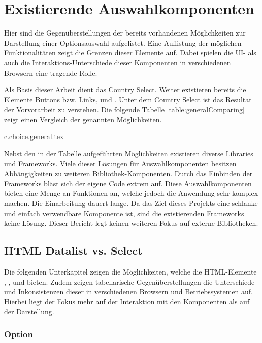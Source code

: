 \chapter{Existierende Auswahlkomponenten}
\label{chap:existingComponents}

Hier sind die Gegenüberstellungen der bereits vorhandenen Möglichkeiten zur Darstellung einer Optionsauswahl aufgelistet. 
Eine Auflistung der möglichen Funktionalitäten zeigt die Grenzen dieser Elemente auf. 
Dabei spielen die UI- als auch die Interaktions-Unterschiede dieser Komponenten in verschiedenen Browsern eine tragende Rolle. 

Als Basis dieser Arbeit dient das Country Select. 
Weiter existieren bereits die Elemente Buttons bzw. Links,  und . 
Unter dem Country Select ist das Resultat der Vorvorarbeit zu verstehen. 
Die folgende Tabelle \ref{table:generalComparing} zeigt einen Vergleich der genannten Möglichkeiten. 

{c.choice.general.tex}

Nebst den in der Tabelle aufgeführten Möglichkeiten existieren diverse Libraries und Frameworks. 
Viele dieser Lösungen für Auswahlkomponenten besitzen Abhängigkeiten zu weiteren Bibliothek-Komponenten. 
Durch das Einbinden der Frameworks bläst sich der eigene Code extrem auf. 
Diese Auswahlkomponenten bieten eine Menge an Funktionen an, welche jedoch die Anwendung sehr komplex machen. 
Die Einarbeitung dauert lange. 
Da das Ziel dieses Projekts eine schlanke und einfach verwendbare Komponente ist, sind die existierenden Frameworks keine Lösung. 
Dieser Bericht legt keinen weiteren Fokus auf externe Bibliotheken. 


\section{HTML Datalist vs. Select}
\label{sec:datalistSelect}

Die folgenden Unterkapitel zeigen die Möglichkeiten, welche die HTML-Elemente , ,  und  bieten. 
Zudem zeigen tabellarische Gegenüberstellungen die Unterschiede und Inkonsistenzen dieser in verschiedenen Browsern und Betriebssystemen auf. 
Hierbei liegt der Fokus mehr auf der Interaktion mit den Komponenten als auf der Darstellung. 


\subsection{Option}
\label{sec:option}

